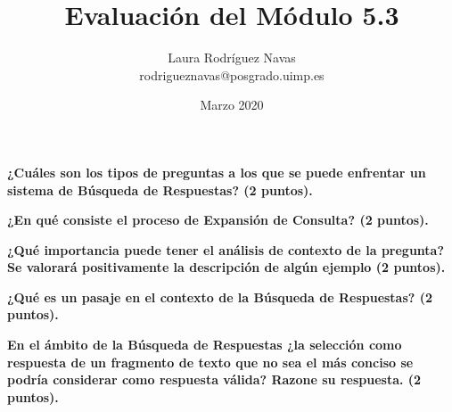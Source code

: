 \documentclass[11pt]{exam}
\title{Evaluación del Módulo 5.3}
\author{Laura Rodríguez Navas \\ rodrigueznavas@posgrado.uimp.es}
\date{Marzo 2020}
\begin{document}
	
\maketitle

\begin{questions}
	
{\bf \question ¿Cuáles son los tipos de preguntas a los que se puede enfrentar un sistema de Búsqueda de Respuestas? (2 puntos).}

{\bf \question ¿En qué consiste el proceso de Expansión de Consulta? (2 puntos).}

{\bf \question ¿Qué importancia puede tener el análisis de contexto de la pregunta? Se valorará positivamente la descripción de algún ejemplo (2 puntos).}

{\bf \question ¿Qué es un pasaje en el contexto de la Búsqueda de Respuestas? (2 puntos).}

{\bf \question En el ámbito de la Búsqueda de Respuestas ¿la selección como respuesta de un fragmento de texto que no sea el más conciso se podría considerar como respuesta válida? Razone su respuesta. (2 puntos).}

\end{questions}
	
\end{document}
